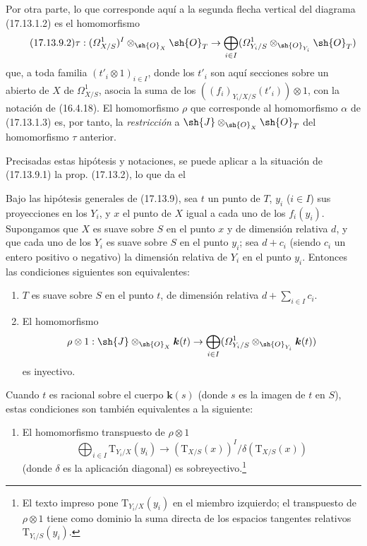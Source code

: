 \begin{env}[17.13.9]
Por otra parte, lo que corresponde aquí a la segunda flecha vertical del diagrama (17.13.1.2) es el homomorfismo
\[
\label{IV.17.13.9.2}
\tag{17.13.9.2}
\tau:(\varOmega^1_{X/S})^I\otimes_{\sh{O}_X}\sh{O}_T\to\bigoplus_{i\in I}(\varOmega^1_{Y_i/S}\otimes_{\sh{O}_{Y_i}}\sh{O}_T)
\]
que, a toda familia $(t'_i\otimes1)_{i\in I}$, donde los $t'_i$ son aquí secciones sobre un abierto de $X$ de $\varOmega^1_{X/S}$, asocia la suma de los $((f_i)_{Y_i/X/S}(t'_i))\otimes1$, con la notación de (16.4.18). El homomorfismo $\rho$ que corresponde al homomorfismo $\alpha$ de (17.13.1.3) es, por tanto, la \emph{restricción} a $\sh{J}\otimes_{\sh{O}_X}\sh{O}_T$ del homomorfismo $\tau$ anterior.

Precisadas estas hipótesis y notaciones, se puede aplicar a la situación de (17.13.9.1) la prop. (17.13.2), lo que da el
\end{env}

\begin{corollary}[17.13.10]
\label{IV.17.13.10}
Bajo las hipótesis generales de \textup{(17.13.9)}, sea $t$ un punto de $T$, $y_i$ \textup{($i\in I$)} sus proyecciones en los $Y_i$, y $x$ el punto de $X$ igual a cada uno de los $f_i(y_i)$. Supongamos que $X$ es suave sobre $S$ en el punto $x$ y de dimensión relativa $d$, y que cada uno de los $Y_i$ es suave sobre $S$ en el punto $y_i$; sea $d+c_i$ \textup{(}siendo $c_i$ un entero positivo o negativo\textup{)} la dimensión relativa de $Y_i$ en el punto $y_i$. Entonces las condiciones siguientes son equivalentes:


\begin{enumerate}
  \item[\textup{a)}] $T$ es suave sobre $S$ en el punto $t$, de dimensión relativa $d+\sum_{i\in I}c_i$.
  \item[\textup{b)}] El homomorfismo
  \[
  \rho\otimes1:\sh{J}\otimes_{\sh{O}_X}\boldsymbol{k}(t)\to\bigoplus_{i\in I}(\varOmega^1_{Y_i/S}\otimes_{\sh{O}_{Y_i}}\boldsymbol{k}(t))
  \]
  es inyectivo.
\end{enumerate}
Cuando $t$ es racional sobre el cuerpo $\boldsymbol{k}(s)$ \textup{(}donde $s$ es la imagen de $t$ en $S$\textup{)}, estas condiciones son también equivalentes a la siguiente:
\begin{enumerate}
  \item[\textup{b$'$)}] El homomorfismo transpuesto de $\rho\otimes1$
  \[
  \bigoplus_{i\in I}\mathrm{T}_{Y_i/X}(y_i)\to(\mathrm{T}_{X/S}(x))^I/\delta(\mathrm{T}_{X/S}(x))
  \]
  (donde $\delta$ es la aplicación diagonal) es sobreyectivo.\footnote{El texto impreso pone $\mathrm{T}_{Y_i/X}(y_i)$ en el miembro izquierdo; el transpuesto de $\rho\otimes1$ tiene como dominio la suma directa de los espacios tangentes relativos $\mathrm{T}_{Y_i/S}(y_i)$.}
\end{enumerate}
\end{corollary}

